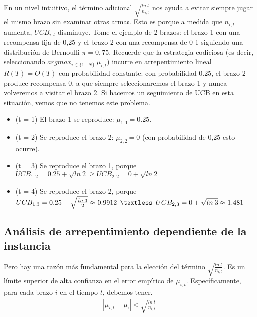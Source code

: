 \documentclass{article}
\begin{document}
En un nivel intuitivo, el término adicional $\sqrt{\frac{ln\>t}{n_{i,t}}}$ nos ayuda a evitar siempre jugar el mismo brazo sin examinar otras armas. Esto es porque a medida que $n_{i, t}$ aumenta, $UCB_{i,t}$ disminuye. Tome el ejemplo de 2 brazos: el brazo 1 con una recompensa fija de 0,25 y el brazo 2 con una recompensa de 0-1 siguiendo una distribución de Bernoulli $\pi = 0,75$. Recuerde que la estrategia codiciosa (es decir, seleccionando $arg max_{i \in \{1...N\} }\>\mu_{i,t}$) incurre en arrepentimiento lineal $R (T) = O (T)$ con probabilidad constante: con probabilidad 0.25, el brazo 2 produce recompensa 0, a que siempre seleccionaremos el brazo 1 y nunca volveremos a visitar el brazo 2. Si hacemos un seguimiento de UCB en esta situación, vemos que no tenemos este problema.
\begin{itemize}
    \item (t = 1) El brazo 1 se reproduce: $\mu_{1,1}=0.25$.
    \item (t = 2) Se reproduce el brazo 2: $\mu_{2,2}=0$ (con probabilidad de 0,25 esto ocurre).
    \item (t = 3) Se reproduce el brazo 1, porque $UCB_{1, 2} = 0.25 + \sqrt{ln\>2} \geq UCB_{2,2} = 0 + \sqrt{ln \>2}$
    \item (t = 4) Se reproduce el brazo 2, porque $UCB_{1,3} = 0.25 + \sqrt{\frac{ln \> 3}{2}} \approx 0.9912 \>\> \textless \>\> UCB_{2,3} = 0 + \sqrt{ln \>3} \approx 1.481$
\end{itemize}

\subsection{Análisis de arrepentimiento dependiente de la instancia}

Pero hay una razón más fundamental para la elección del término $\sqrt{\frac{ln \> t}{n_{i,t}}}$. Es un límite superior de alta confianza en el error empírico de $\mu_{i, t}$. Específicamente, para cada brazo $i$ en el tiempo $t$, debemos tener.
\begin{gather}
    |\mu_{i,t}-\mu_{i}| < \sqrt{\frac{ln\>t}{n_{i,t}}}
\end{gather}
\end{document}
